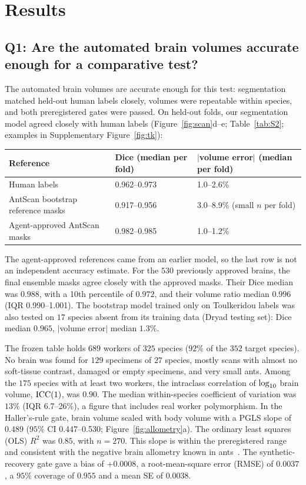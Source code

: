 \documentclass[11pt]{article}
\begin{document}
\section{Results}\label{sec:results}

\subsection{Q1: Are the automated brain volumes accurate enough for a comparative test?}\label{sec:q1}

The automated brain volumes are accurate enough for this test: segmentation matched held-out human labels closely,
volumes were repeatable within species, and both preregistered gates were passed. On held-out folds, our segmentation
model agreed closely with human labels (Figure~\ref{fig:scan}d--e; Table~\ref{tab:S2}; examples in Supplementary
Figure~\ref{fig:tk}):
\begin{center}
\small
\begin{tabular}{@{}lll@{}}
\toprule
Reference & Dice (median per fold) & $|$volume error$|$ (median per fold) \\
\midrule
Human labels~\citep{toulkeridou2023} & 0.962--0.973 & 1.0--2.6\% \\
AntScan bootstrap reference masks & 0.917--0.956 & 3.0--8.9\% (small $n$ per fold) \\
Agent-approved AntScan masks & 0.982--0.985 & 1.0--1.2\% \\
\bottomrule
\end{tabular}
\end{center}
The agent-approved references came from an earlier model, so the last row is not an independent accuracy estimate.
For the $530$ previously approved brains, the final ensemble masks agree closely with the approved masks. Their Dice
median was $0.988$, with a 10th percentile of $0.972$, and their volume ratio median $0.996$ (IQR 0.990--1.001). The
bootstrap model trained only on Toulkeridou labels was also tested on $17$ species absent from its training data
(Dryad testing set): Dice median $0.965$, $|$volume error$|$ median $1.3\%$.

The frozen table holds $689$ workers of $325$ species ($92\%$ of the $352$ target species). No brain was found for
$129$ specimens of $27$ species, mostly scans with almost no soft-tissue contrast, damaged or empty specimens, and very
small ants. Among the $175$ species with at least two workers, the intraclass correlation of $\log_{10}$ brain volume,
$\mathrm{ICC}(1)$, was $0.90$. The median within-species coefficient of variation was $13\%$ (IQR 6.7--26\%), a figure that
includes real worker polymorphism. In the Haller's-rule gate, brain volume scaled with body volume with a PGLS slope
of $0.489$ ($95\%$ CI 0.447--0.530; Figure~\ref{fig:allometry}a). The ordinary least squares (OLS) $R^2$ was $0.85$,
with $n = 270$. This slope is within the preregistered range and consistent with the negative brain allometry known in
ants~\citep{seid2011,wehner2007}. The synthetic-recovery gate gave a bias of $+0.0008$, a root-mean-square error
(RMSE) of $0.0037$, a $95\%$ coverage of $0.955$ and a mean SE of $0.0038$.
\end{document}
